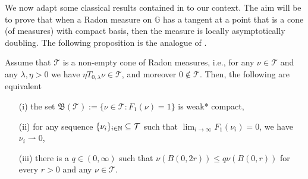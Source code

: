 \documentclass[10pt, a4paper,
oneside, headinclude,footinclude]{scrartcl}
\begin{document}
We now adapt some classical results contained in \cite{Preiss1987GeometryDensities} to our context. The aim will be to prove that when a Radon measure on $\mathbb G$ has a tangent at a point that is a cone (of measures) with compact basis, then the measure is locally asymptotically doubling. The following proposition is the analogue of \cite[Propostion 2.2]{Preiss1987GeometryDensities}.

\begin{proposizione}\label{prop:asdoubl}
Assume that $\mathcal{T}$ is a non-empty cone of Radon measures, i.e.,
for any $\nu\in\mathcal{T}$ and any $\lambda,\eta>0$ we have $\eta T_{0,\lambda}\nu\in\mathcal{T}$, and moreover $0\not\in \mathcal{T}$. Then, the following are equivalent
\begin{enumerate}
    \item[(i)] the set $\mathfrak{B}(\mathcal{T}):=\{\nu\in\mathcal{T}:F_{1}(\nu)=1\}$ is weak* compact,
    \item[(ii)] for any sequence $\{\nu_i\}_{i\in\mathbb{N}}\subseteq \mathcal{T}$ such that $\lim_{i\to\infty}F_1(\nu_i)=0$, we have $\nu_i\rightharpoonup 0$,
    \item[(iii)]there is a $q\in(0,\infty)$ such that $\nu(B(0,2r))\leq q\nu(B(0,r))$ for every $r>0$ and any $\nu\in\mathcal{T}$.
\end{enumerate}
\end{proposizione}
\end{document}
